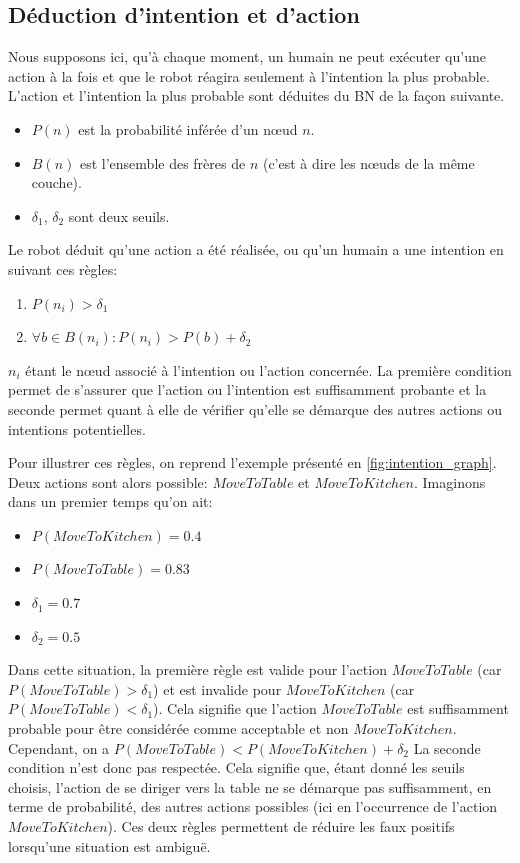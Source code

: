 \documentclass[a4paper,11pt,twoside]{StyleThese}
\begin{document}
\subsection{Déduction d'intention et d'action}
\label{sec:intentionactioninf}
Nous supposons ici, qu'à chaque moment, un humain ne peut exécuter qu'une action à la fois et que le robot réagira seulement à l'intention la plus probable. L'action et l'intention la plus probable sont déduites du BN de la façon suivante. 

\begin{itemize}
\item $P(n)$ est la probabilité inférée d'un nœud $n$.
\item $B(n)$ est l'ensemble des frères de $n$ (c'est à dire les nœuds de la même couche).
\item $\delta_1$, $\delta_2$ sont deux seuils.
\end{itemize}

Le robot déduit qu'une action a été réalisée, ou qu'un humain a une intention en suivant ces règles:

\begin{enumerate}
\item \(P(n_i)>\delta_1\) 
\item \(\forall b \in B(n_i): P(n_i)>P(b)+\delta_2\)
\end{enumerate}

$n_i$ étant le nœud associé à l'intention ou l'action concernée.
La première condition permet de s'assurer que l'action ou l'intention est suffisamment probante et la seconde permet quant à elle de vérifier qu'elle se démarque des autres actions ou intentions potentielles.

Pour illustrer ces règles, on reprend l'exemple présenté en \ref{fig:intention_graph}.
Deux actions sont alors possible: $MoveToTable$ et $MoveToKitchen$.
Imaginons dans un premier temps qu'on ait:

\begin{itemize}
\item $P(MoveToKitchen) = 0.4$
\item $P(MoveToTable) = 0.83$
\item $\delta_1 = 0.7$
\item $\delta_2 = 0.5$
\end{itemize}

Dans cette situation, la première règle est valide pour l'action $MoveToTable$ (car $P(MoveToTable) > \delta_1$) et est invalide pour $MoveToKitchen$ (car $P(MoveToTable) < \delta_1$). Cela signifie que l'action $MoveToTable$ est suffisamment probable pour être considérée comme acceptable et non $MoveToKitchen$. Cependant, on a  $P(MoveToTable)<P(MoveToKitchen)+\delta_2$ La seconde condition n'est donc pas respectée. Cela signifie que, étant donné les seuils choisis, l'action de se diriger vers la table ne se démarque pas suffisamment, en terme de probabilité, des autres actions possibles (ici en l'occurrence de l'action $MoveToKitchen$).
Ces deux règles permettent de réduire les faux positifs lorsqu'une situation est ambiguë.
\end{document}
